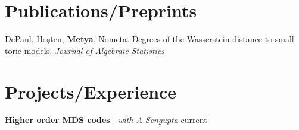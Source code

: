 \section{Publications/Preprints}





\begin{etaremune}[leftmargin=13pt]
\item {\color{grey}DePaul, Ho\c{s}ten, \textbf{Metya}, Nometa}. \href{https://arxiv.org/abs/2402.09626}{Degrees of the Wasserstein distance to small toric models}.
\textit{Journal of Algebraic Statistics}
\end{etaremune}
\vspace{\mygap}


\section{Projects/Experience}
\resumeSubHeadingListStart


\resumeProjectHeading
{\textbf{Higher order MDS codes} $|$ \textit{\color{gray}with A Sengupta}}
{current}
{}
\vspace{\mygap}

